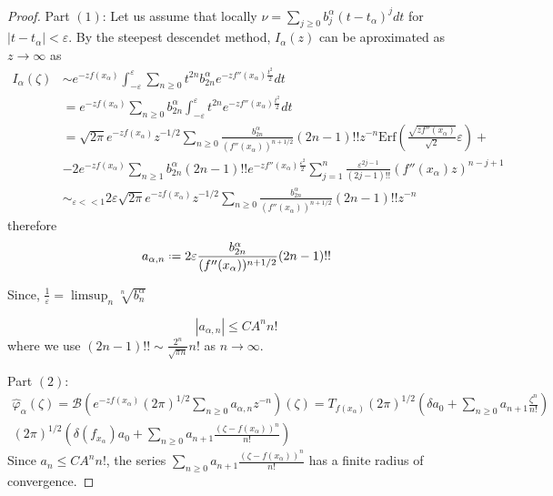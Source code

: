 \documentclass[11pt,a4paper,twoside,leqno,noamsfonts]{amsart}
\numberwithin{equation}{section}
\begin{document}
\begin{proof}
Part $(1)$: Let us assume that locally $\nu=\sum_{j\geq 0}b_j^{\alpha}(t-t_{\alpha})^{j}dt$ for $|t-t_\alpha|<\varepsilon$. By the steepest descendet method, $I_\alpha(z)$ can be aproximated as $z\to\infty$ as
\begin{align*}
I_\alpha(\zeta)&\sim e^{-zf(x_\alpha)}\int_{-\varepsilon}^{\varepsilon}\sum_{n\geq 0}t^{2n}b_{2n}^{\alpha}e^{-zf''(x_\alpha)\frac{t^2}{2}}dt\\
&=e^{-zf(x_\alpha)}\sum_{n\geq 0}b_{2n}^{\alpha}\int_{-\varepsilon}^{\varepsilon}t^{2n}e^{-zf''(x_{\alpha})\frac{t^2}{2}}dt\\
&=\sqrt{2\pi}e^{-zf(x_\alpha)}z^{-1/2}\sum_{n\geq 0}\frac{b_{2n}^{\alpha}}{(f''(x_{\alpha}))^{n+1/2}}(2n-1)!! z^{-n}\mathrm{Erf}\left(\frac{\sqrt{z f''(x_\alpha)}}{\sqrt{2}}\varepsilon\right)+\\
&-2e^{-zf(x_\alpha)}\sum_{n\geq 1}b_{2n}^{\alpha}(2n-1)!!e^{-zf''(x_{\alpha})\frac{\varepsilon^2}{2}}\sum_{j=1}^n\frac{\varepsilon^{2j-1}}{(2j-1)!!}\left(f''(x_\alpha)z\right)^{n-j+1}\\
&\sim_{\varepsilon<<1} 2\varepsilon \sqrt{2\pi}e^{-zf(x_\alpha)}z^{-1/2}\sum_{n\geq 0}\frac{b_{2n}^{\alpha}}{(f''(x_{\alpha}))^{n+1/2}}(2n-1)!! z^{-n}
\end{align*} 
therefore \[a_{\alpha,n}\defeq 2\varepsilon\frac{b_{2n}^{\alpha}}{(f''(x_{\alpha}))^{n+1/2}}(2n-1)!!\]

Since, $\tfrac{1}{\varepsilon}=\limsup_{n}\sqrt[n]{b_{n}^{\alpha}}$

\[|a_{\alpha,n}|\leq CA^n n!\]
where we use $(2n-1)!!\sim \tfrac{2^n}{\sqrt{\pi n}}n!$ as $n\to \infty$.

Part $(2)$: \begin{align*}
\hat{\varphi}_\alpha(\zeta)=\mathcal{B}\left(e^{-zf(x_\alpha)}(2\pi)^{1/2} \sum_{n\geq 0}a_{\alpha,n}z^{-n}\right)(\zeta)=T_{f(x_\alpha)}(2\pi)^{1/2} \left(\delta a_0+\sum_{n\geq 0}a_{n+1}\frac{\zeta^n}{n!}\right)\\
(2\pi)^{1/2} \left(\delta(f_{x_\alpha}) a_0+\sum_{n\geq 0}a_{n+1}\frac{(\zeta-f(x_\alpha))^n}{n!}\right)
\end{align*}
Since $a_{n}\leq CA^nn!$, the series $\sum_{n\geq 0}a_{n+1}\frac{(\zeta-f(x_\alpha))^n}{n!}$ has a finite radius of convergence. 


\end{proof}
\end{document}

